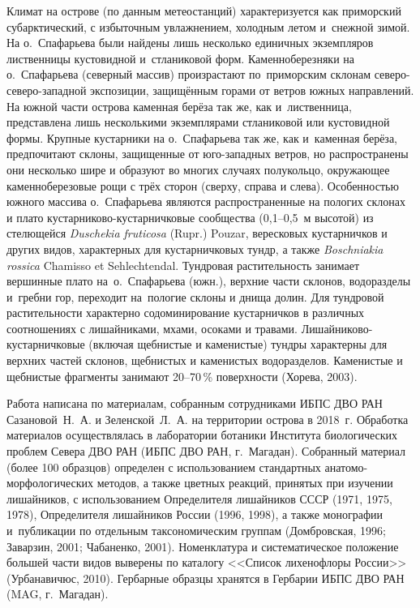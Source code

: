 Климат на острове (по данным метеостанций) характеризуется как приморский субарктический, с избыточным увлажнением, холодным летом и~снежной зимой. На о.~Спафарьева были найдены лишь несколько единичных экземпляров лиственницы кустовидной и~стланиковой форм. Каменноберезняки на о.~Спафарьева (северный массив) произрастают по~приморским склонам северо-северо-западной экспозиции, защищённым горами от ветров южных направлений. На южной части острова каменная берёза так же, как и~лиственница, представлена лишь несколькими экземплярами стланиковой или кустовидной формы. Крупные кустарники на о.~Спафарьева так же, как и~каменная берёза, предпочитают склоны, защищенные от юго-западных ветров, но распространены они несколько шире и образуют во многих случаях полукольцо, окружающее каменноберезовые рощи с трёх сторон (сверху, справа и слева). Особенностью южного массива о.~Спафарьева являются распространенные на пологих склонах и плато кустарниково-кустарничковые сообщества (0,1--0,5~м высотой) из стелющейся \textit{Duschekia fruticosa} (Rupr.) Pouzar, вересковых кустарничков и других видов, характерных для кустарничковых тундр, а также \textit{Boschniakia rossica} Chamisso et Sehlechtendal. Тундровая растительность занимает вершинные плато на~о.~Спафарьева (южн.), верхние части склонов, водоразделы и~гребни гор, переходит на~пологие склоны и днища долин. Для тундровой растительности характерно содоминирование кустарничков в различных соотношениях с лишайниками, мхами, осоками и травами. Лишайниково-кустарничковые (включая щебнистые и каменистые) тундры характерны для верхних частей склонов, щебнистых и каменистых водоразделов. Каменистые и щебнистые фрагменты занимают 20--70\,\% поверхности (Хорева, 2003).




Работа написана по материалам, собранным сотрудниками ИБПС ДВО РАН Сазановой~Н.~А. и Зеленской~Л.~А. на территории острова в 2018~г. Обработка материалов осуществлялась в лаборатории ботаники Института биологических проблем Севера ДВО РАН (ИБПС ДВО РАН, г.~Магадан). Собранный материал (более 100 образцов) определен с использованием стандартных анатомо-морфологических методов, а также цветных реакций, принятых при изучении лишайников, с использованием Определителя лишайников СССР (1971, 1975, 1978), Определителя лишайников России (1996, 1998), а также монографии и~публикации по отдельным таксономическим группам (Домбровская, 1996; Заварзин, 2001; Чабаненко, 2001). Номенклатура и систематическое положение большей части видов выверены по каталогу <<Список лихенофлоры России>> (Урбанавичюс, 2010). Гербарные образцы хранятся в Гербарии ИБПС ДВО РАН (MAG, г.~Магадан).

